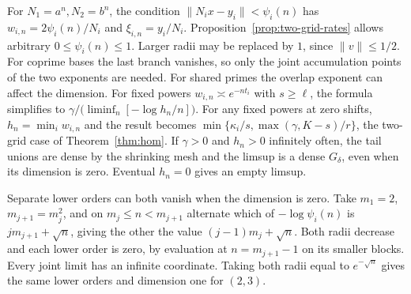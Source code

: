 \documentclass[11pt,reqno,a4paper]{amsart}
\theoremstyle{remark}
\numberwithin{equation}{section}
\begin{document}
For \(N_1=a^n,N_2=b^n\), the condition
\(\|N_i x-y_i\|<\psi_i(n)\) has \(w_{i,n}=2\psi_i(n)/N_i\) and
\(\xi_{i,n}=y_i/N_i\). Proposition~\ref{prop:two-grid-rates} allows
arbitrary \(0\le\psi_i(n)\le1\). Larger radii may be replaced by
\(1\), since \(\|v\|\le1/2\). For coprime bases the last branch
vanishes, so only the joint accumulation points of the two
exponents are needed. For shared primes the overlap exponent can
affect the dimension. For fixed powers \(w_{i,n}\asymp e^{-nt_i}\)
with \(s\ge\ell\), the formula simplifies to
\(\gamma/\bigl(\liminf_n[-\log h_n/n]\bigr)\).
For any fixed powers at zero shifts, \(h_n=\min_i w_{i,n}\)
and the result becomes
\(\min\{\kappa_i/s,\max(\gamma,K-s)/r\}\), the two-grid case of
Theorem~\ref{thm:hom}.
If \(\gamma>0\) and \(h_n>0\) infinitely often, the tail unions
are dense by the shrinking mesh and the limsup is a dense
\(G_\delta\), even when its dimension is zero. Eventual \(h_n=0\)
gives an empty limsup.

Separate lower orders can both vanish when the dimension is zero.
Take \(m_1=2\), \(m_{j+1}=m_j^2\), and on \(m_j\le n<m_{j+1}\)
alternate which of \(-\log\psi_i(n)\) is \(j m_{j+1}+\sqrt n\),
giving the other the value \((j-1)m_j+\sqrt n\).
Both radii decrease and each lower order is zero, by evaluation
at \(n=m_{j+1}-1\) on its smaller blocks. Every joint limit has
an infinite coordinate. Taking both radii equal to \(e^{-\sqrt n}\)
gives the same lower orders and dimension one for \((2,3)\).
\end{document}
